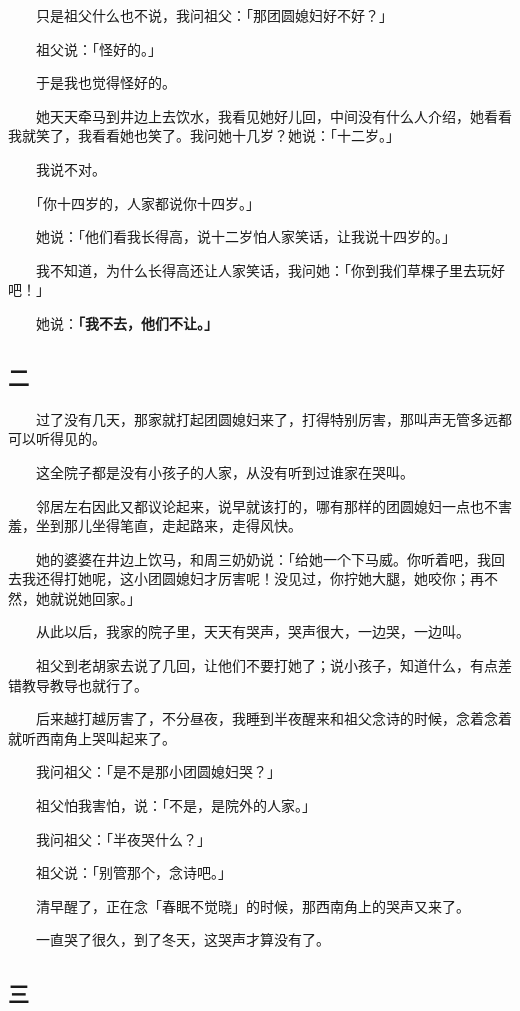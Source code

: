 \documentclass[UTF8]{ctexart}
\begin{document}
　　只是祖父什么也不说，我问祖父：「那团圆媳妇好不好？」

　　祖父说：「怪好的。」

　　于是我也觉得怪好的。

　　她天天牵马到井边上去饮水，我看见她好儿回，中间没有什么人介绍，她看看我就笑了，我看看她也笑了。我问她十几岁？她说：「十二岁。」

　　我说不对。

　　「你十四岁的，人家都说你十四岁。」

　　她说：「他们看我长得高，说十二岁怕人家笑话，让我说十四岁的。」

　　我不知道，为什么长得高还让人家笑话，我问她：「你到我们草棵子里去玩好吧！」

　　她说：\textbf{「我不去，他们不让。」}

\subsection{二}

　　过了没有几天，那家就打起团圆媳妇来了，打得特别厉害，那叫声无管多远都可以听得见的。

　　这全院子都是没有小孩子的人家，从没有听到过谁家在哭叫。

　　邻居左右因此又都议论起来，说早就该打的，哪有那样的团圆媳妇一点也不害羞，坐到那儿坐得笔直，走起路来，走得风快。

　　她的婆婆在井边上饮马，和周三奶奶说：「给她一个下马威。你听着吧，我回去我还得打她呢，这小团圆媳妇才厉害呢！没见过，你拧她大腿，她咬你；再不然，她就说她回家。」

　　从此以后，我家的院子里，天天有哭声，哭声很大，一边哭，一边叫。

　　祖父到老胡家去说了几回，让他们不要打她了；说小孩子，知道什么，有点差错教导教导也就行了。

　　后来越打越厉害了，不分昼夜，我睡到半夜醒来和祖父念诗的时候，念着念着就听西南角上哭叫起来了。

　　我问祖父：「是不是那小团圆媳妇哭？」

　　祖父怕我害怕，说：「不是，是院外的人家。」

　　我问祖父：「半夜哭什么？」

　　祖父说：「别管那个，念诗吧。」

　　清早醒了，正在念「春眠不觉晓」的时候，那西南角上的哭声又来了。

　　一直哭了很久，到了冬天，这哭声才算没有了。

\subsection{三}
\end{document}
